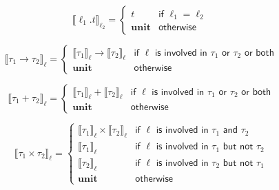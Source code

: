 \documentclass{article}
\begin{document}
$$
 \llbracket  \ell_1 . t \rrbracket _{\ell_2} = \left\{
    \begin{array}{ll}
    t & \textsf{if } \ell_1 = \ell_2 \\
    \textbf{unit} & \textsf{otherwise}
    \end{array}
\right.
$$

$$
 \llbracket  \tau_1 \to \tau_2 \rrbracket _\ell = \left\{
    \begin{array}{ll}
    \llbracket  \tau_1 \rrbracket _\ell \to \llbracket  \tau_2 \rrbracket _\ell & \textsf{if } \ell \textsf{ is involved in } \tau_1 \textsf{ or } \tau_2 \textsf{ or both}\\
    \textbf{unit} & \textsf{otherwise}
    \end{array}
\right.
$$

$$
 \llbracket  \tau_1 + \tau_2 \rrbracket _\ell = \left\{
    \begin{array}{ll}
    \llbracket  \tau_1 \rrbracket_\ell + \llbracket  \tau_2 \rrbracket _\ell & \textsf{if } \ell \textsf{ is involved in } \tau_1 \textsf{ or } \tau_2 \textsf{ or both}\\
    \textbf{unit} & \textsf{otherwise}
    \end{array}
\right.
$$

$$
 \llbracket  \tau_1 \times \tau_2 \rrbracket _\ell = \left\{
    \begin{array}{ll}
    \llbracket  \tau_1 \rrbracket_\ell \times \llbracket  \tau_2 \rrbracket _\ell & \textsf{if } \ell \textsf{ is involved in } \tau_1 \textsf{ and } \tau_2 \\
    \llbracket  \tau_1 \rrbracket_\ell & \textsf{if } \ell \textsf{ is involved in } \tau_1 \textsf{ but not } \tau_2 \\
    \llbracket  \tau_2 \rrbracket_\ell & \textsf{if } \ell \textsf{ is involved in } \tau_2 \textsf{ but not } \tau_1 \\
    \textbf{unit} & \textsf{otherwise}
    \end{array}
\right.
$$
\end{document}
